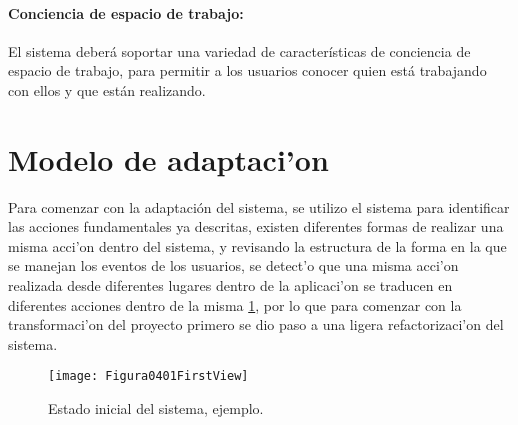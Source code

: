 \paragraph{Conciencia de espacio de trabajo:}
​El sistema deberá soportar una variedad de
características de conciencia de espacio de trabajo, para permitir a los usuarios
conocer quien está trabajando con ellos y que están realizando.

\section{Modelo de adaptaci'on}

Para comenzar con la adaptación del sistema, se utilizo  el sistema para identificar las acciones fundamentales ya descritas, existen diferentes formas de realizar una misma acci'on dentro del sistema, y revisando la estructura de la forma en la que se manejan los eventos de los usuarios, se detect'o que una misma acci'on realizada desde diferentes lugares dentro de la aplicaci'on se traducen en diferentes acciones dentro de la misma \ref{fig:FV}, por lo que para comenzar con la transformaci'on del proyecto primero se dio paso a una ligera refactorizaci'on del sistema.

\begin{figure}[h]
    \centering
    \texttt{[image: Figura0401FirstView]}
    \caption{Estado inicial del sistema, ejemplo.}
    \label{fig:FV}
\end{figure}




